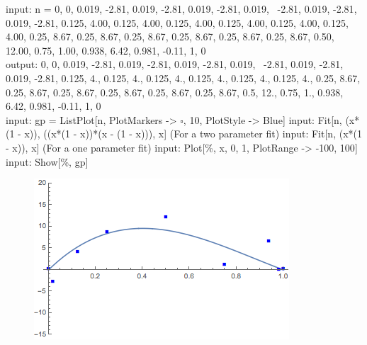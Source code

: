input: n = {{0, 0}, {0.019, -2.81}, {0.019, -2.81}, {0.019, -2.81}, {0.019, \
		-2.81}, {0.019, -2.81}, {0.019, -2.81}, {0.125, 4.00}, {0.125, 
		4.00}, {0.125, 4.00}, {0.125, 4.00}, {0.125, 4.00}, {0.125, 
		4.00}, {0.25, 8.67}, {0.25, 8.67}, {0.25, 8.67}, {0.25, 
		8.67}, {0.25, 8.67}, {0.25, 8.67}, {0.50, 12.00}, {0.75, 
		1.00}, {0.938, 6.42}, {0.981, -0.11}, {1, 0}}
\\
\noindent output: {{0, 0}, {0.019, -2.81}, {0.019, -2.81}, {0.019, -2.81}, {0.019, \
		-2.81}, {0.019, -2.81}, {0.019, -2.81}, {0.125, 4.}, {0.125, 
		4.}, {0.125, 4.}, {0.125, 4.}, {0.125, 4.}, {0.125, 4.}, {0.25, 
		8.67}, {0.25, 8.67}, {0.25, 8.67}, {0.25, 8.67}, {0.25, 
		8.67}, {0.25, 8.67}, {0.5, 12.}, {0.75, 1.}, {0.938, 
		6.42}, {0.981, -0.11}, {1, 0}}
\\
\noindent input: gp = ListPlot[n, PlotMarkers -> {$\square$, 10}, PlotStyle -> {Blue}]
\noindent input: Fit[n, {(x*(1 - x)), ((x*(1 - x))*(x - (1 - x)))}, x] (For a two parameter fit)
\noindent input: Fit[n, {(x*(1 - x))}, x] (For a one parameter fit)
\noindent input: Plot[\%, {x, 0, 1}, PlotRange -> {-100, 100}]
\noindent input: Show[\%, gp]

\begin{figure}[H]
	\centering
	\includegraphics[width=\textwidth]{Appendix-C/Figures/fitting.png}
\end{figure}
